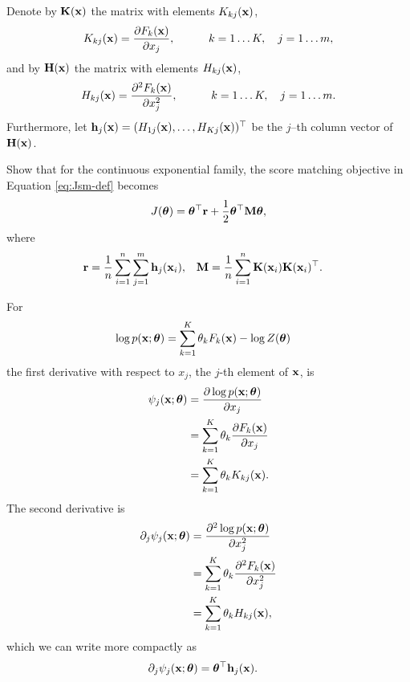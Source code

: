 \begin{exenumerate}

\item Denote by $\mathbf{K}(\mathbf{x})$ the matrix with elements $K_{kj}(\mathbf{x})$,
  \begin{equation}
    K_{kj}(\mathbf{x}) = \frac{\partial F_k(\mathbf{x})}{\partial x_j}, \quad \quad \quad k=1 \ldots K, \quad j=1 \ldots m,
  \end{equation}
  and by $\mathbf{H}(\mathbf{x})$ the matrix with elements $H_{kj}(\mathbf{x})$,
  \begin{equation}
    H_{kj}(\mathbf{x}) = \frac{\partial^2 F_k(\mathbf{x})}{\partial x_j^2}, \quad \quad \quad k=1 \ldots K, \quad j=1 \ldots m.
  \end{equation}
  Furthermore, let $\mathbf{h}_j(\mathbf{x}) = (H_{1j}(\mathbf{x}), \ldots, H_{Kj}(\mathbf{x}))^\top$ be the $j$–th column vector of $\mathbf{H}(\mathbf{x})$.
  
  Show that for the continuous exponential family, the score matching objective in Equation \eqref{eq:Jsm-def} becomes
  \begin{equation}
    J(\boldsymbol{\theta}) =  \boldsymbol{\theta}^\top \mathbf{r} +  \frac{1}{2} \boldsymbol{\theta}^\top \mathbf{M} \boldsymbol{\theta},
    \end{equation}
    where
    \begin{align}
      \label{eq:Jsm-sol}
       \mathbf{r}&=\frac{1}{n}\sum_{i=1}^n \sum_{j=1}^m \mathbf{h}_j(\mathbf{x}_i), & \mathbf{M} &= \frac{1}{n}\sum_{i=1}^n \mathbf{K}(\mathbf{x}_i)\mathbf{K}(\mathbf{x}_i)^\top.
    \end{align}
     
  \begin{solution}
    For
    \begin{align}
      \log p(\mathbf{x};\boldsymbol{\theta}) &= \sum_{k=1}^K \theta_k F_k(\mathbf{x}) -\log Z(\boldsymbol{\theta})
    \end{align}
    the first derivative with respect to $x_j$, the $j$-th element of $\mathbf{x}$, is
    \begin{align}
      \psi_j(\mathbf{x}; \boldsymbol{\theta}) &= \frac{\partial \log p(\mathbf{x}; \boldsymbol{\theta})}{\partial x_j}\\
      & = \sum_{k=1}^K \theta_k \frac{\partial F_k(\mathbf{x})}{\partial x_j}\\
      & =  \sum_{k=1}^K \theta_k K_{kj}(\mathbf{x}).
    \end{align}
    The second derivative is
    \begin{align}
      \partial_j \psi_j(\mathbf{x}; \boldsymbol{\theta}) & = \frac{\partial^2 \log p(\mathbf{x}; \boldsymbol{\theta})}{\partial x_j^2}\\
      & =  \sum_{k=1}^K \theta_k \frac{\partial^2 F_k(\mathbf{x})}{\partial x_j^2}\\
      & =  \sum_{k=1}^K \theta_k  H_{kj}(\mathbf{x}),
    \end{align}
    which we can write more compactly as
    \begin{align}
      \partial_j  \psi_j(\mathbf{x}; \boldsymbol{\theta}) &= \boldsymbol{\theta}^\top \mathbf{h}_j(\mathbf{x}).
    \end{align}


\end{solution}
\end{exenumerate}
